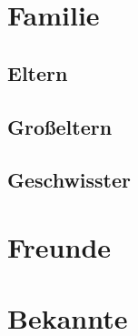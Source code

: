     \chapter{Familie}
        \section{Eltern}
        \section{Großeltern}
        \section{Geschwisster} 
    \chapter{Freunde} 
    \chapter{Bekannte} 